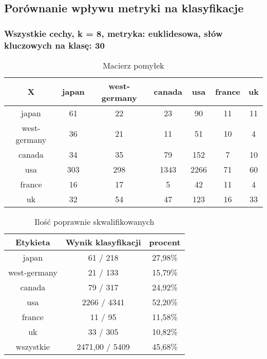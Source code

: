 \documentclass{classrep}
\begin{document}
\newpage
\subsection{Porównanie wpływu metryki na klasyfikacje}

\subsubsection{Wszystkie cechy, k = 8, metryka: euklidesowa, słów kluczowych na klasę: 30}
\begin{table}[h]
\centering
\begin{tabular}{|c|c|c|c|c|c|c|}
\hline
 X  & japan & west-germany & canada & usa & france & uk\\
\hline
japan & 61 & 22 & 23 & 90 & 11 & 11\\
\hline
west-germany & 36 & 21 & 11 & 51 & 10 & 4\\
\hline
canada & 34 & 35 & 79 & 152 & 7 & 10\\
\hline
usa & 303 & 298 & 1343 & 2266 & 71 & 60\\
\hline
france & 16 & 17 & 5 & 42 & 11 & 4\\
\hline
uk & 32 & 54 & 47 & 123 & 16 & 33\\
\hline
\end{tabular}
\caption{Macierz pomyłek}\end{table}

\begin{table}[h]
\centering
\begin{tabular}{|c|c|c|}
\hline
Etykieta & Wynik klasyfikacji & procent\\
\hline
japan & 61 / 218 & 27,98\%\\
\hline
west-germany & 21 / 133 & 15,79\%\\
\hline
canada & 79 / 317 & 24,92\%\\
\hline
usa & 2266 / 4341 & 52,20\%\\
\hline
france & 11 / 95 & 11,58\%\\
\hline
uk & 33 / 305 & 10,82\%\\
\hline
wszystkie & 2471,00 / 5409 & 45,68\%\\
\hline
\end{tabular}
\caption{Ilość poprawnie skwalifikowanych}\end{table}
\newpage
\end{document}

